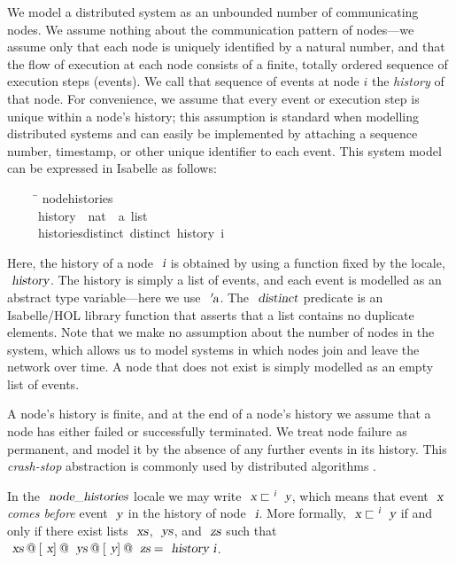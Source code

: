 We model a distributed system as an unbounded number of communicating nodes.
We assume nothing about the communication pattern of nodes---we assume only that each node is uniquely identified by a natural number, and that the flow of execution at each node consists of a finite, totally ordered sequence of execution steps (events).
We call that sequence of events at node $i$ the \emph{history} of that node.
For convenience, we assume that every event or execution step is unique within a node's history; this assumption is standard when modelling distributed systems \cite{Cachin:2011wt} and can easily be implemented by attaching a sequence number, timestamp, or other unique identifier to each event.
This system model can be expressed in Isabelle as follows:
\begin{isabelle}
~~~~\ \=\kill
{} node{\isacharunderscore}histories\ {\isacharequal}\\
~~~~\ \>history\ {\isacharcolon}{\isacharcolon}\ {\isachardoublequoteopen}nat\ {\isasymRightarrow}\ {\isacharprime}a\ list{\isachardoublequoteclose}\ \\
~~~~\ \>histories{\isacharunderscore}distinct{\isacharcolon}\ {\isachardoublequoteopen}distinct\ {\isacharparenleft}history\ i{\isacharparenright}{\isachardoublequoteclose}
\end{isabelle}
Here, the history of a node $\isa{i}$ is obtained by using a function fixed by the locale, $\isa{history}$.
The history is simply a list of events, and each event is modelled as an abstract type variable---here we use $\isa{{\isacharprime}a}$.
The $\isa{distinct}$ predicate is an Isabelle/HOL library function that asserts that a list contains no duplicate elements.
Note that we make no assumption about the number of nodes in the system, which allows us to model systems in which nodes join and leave the network over time.
A node that does not exist is simply modelled as an empty list of events.

A node's history is finite, and at the end of a node's history we assume that a node has either failed or successfully terminated.
We treat node failure as permanent, and model it by the absence of any further events in its history.
This \emph{crash-stop} abstraction is commonly used by distributed algorithms \cite{Cachin:2011wt}.

In the $\isa{node{\isacharunderscore}histories}$ locale we may write $\isa{x} \sqsubset^\isa{i} \isa{y}$, which means that event $\isa{x}$ \emph{comes before} event $\isa{y}$ in the history of node $\isa{i}$.
More formally, $\isa{x} \sqsubset^\isa{i} \isa{y}$ if and only if there exist lists $\isa{xs}$, $\isa{ys}$, and $\isa{zs}$ such that $\isa{xs}\mathbin{@}[\isa{x}]\mathbin{@}\isa{ys}\mathbin{@}[\isa{y}]\mathbin{@}\isa{zs} = \isa{history\ i}$.

